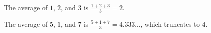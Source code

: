 The average of $1$, $2$, and $3$ is $\frac{1+2+3}{3}=2$.


The average of $5$, $1$, and $7$ is $\frac{5+1+7}{3}=4.333...$, which truncates to $4$.
